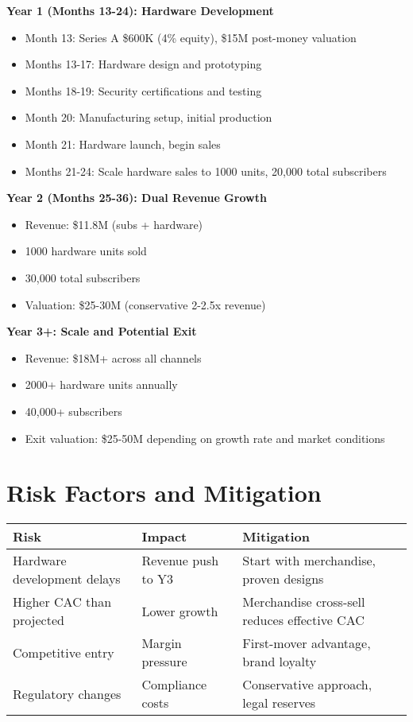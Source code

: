 \documentclass[11pt]{article}
\newcommand{\hwCustomersYearTwo}{1000}
\newcommand{\hwCustomersYearThree}{2000}
\newcommand{\seriesAEquity}{4}
\begin{document}
\textbf{Year 1 (Months 13-24): Hardware Development}
\begin{itemize}
  \item Month 13: Series A \$600K (\seriesAEquity\% equity), \$15M post-money valuation
  \item Months 13-17: Hardware design and prototyping
  \item Months 18-19: Security certifications and testing
  \item Month 20: Manufacturing setup, initial production
  \item Month 21: Hardware launch, begin sales
  \item Months 21-24: Scale hardware sales to \hwCustomersYearTwo{} units, 20,000 total subscribers
\end{itemize}

\textbf{Year 2 (Months 25-36): Dual Revenue Growth}
\begin{itemize}
  \item Revenue: \$11.8M (subs + hardware)
  \item \hwCustomersYearTwo{} hardware units sold
  \item 30,000 total subscribers
  \item Valuation: \$25-30M (conservative 2-2.5x revenue)
\end{itemize}

\textbf{Year 3+: Scale and Potential Exit}
\begin{itemize}
  \item Revenue: \$18M+ across all channels
  \item \hwCustomersYearThree+ hardware units annually
  \item 40,000+ subscribers
  \item Exit valuation: \$25-50M depending on growth rate and market conditions
\end{itemize}

\section{Risk Factors and Mitigation}

\begin{table}[H]
\centering
\begin{tabularx}{\linewidth}{l X X}
\toprule
Risk & Impact & Mitigation \\\midrule
Hardware development delays & Revenue push to Y3 & Start with merchandise, proven designs \\
Higher CAC than projected & Lower growth & Merchandise cross-sell reduces effective CAC \\
Competitive entry & Margin pressure & First-mover advantage, brand loyalty \\
Regulatory changes & Compliance costs & Conservative approach, legal reserves \\
\bottomrule
\end{tabularx}
\end{table}

\printbibliography
\end{document}
